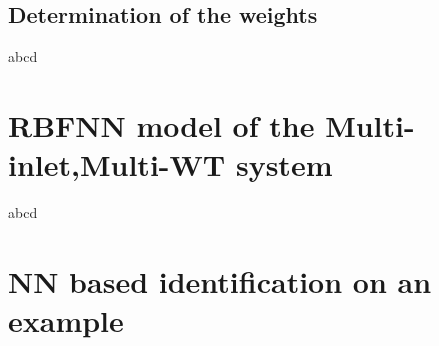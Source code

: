 \subsection{Determination of the weights}
\label{determination_weights} 

abcd

\section{RBFNN model of the Multi-inlet,Multi-WT system}
\label{RBFNN_model_multi_inlet_multi_WT_sys} 

abcd

\section{NN based identification on an example}
\label{NN_based_example} 

